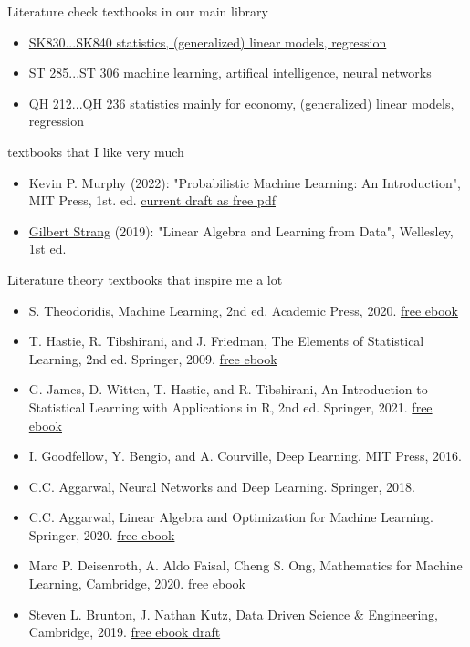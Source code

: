 \documentclass[mathserif, aspectratio=1610]{intbeamer}
\begin{document}
\begin{frame}{Literature}
  check textbooks in our main library
  \begin{itemize}
    \item \href{https://find.ub.uni-rostock.de/sk830}{SK830...SK840 statistics, (generalized) linear models, regression}
    \item ST 285...ST 306 machine learning, artifical intelligence, neural networks
    \item QH 212...QH 236 statistics mainly for economy, (generalized) linear models, regression
  \end{itemize}
  textbooks that I like very much
  \begin{itemize}
    \item Kevin P. Murphy (2022): "Probabilistic Machine Learning: An Introduction", MIT Press, 1st. ed.
    \href{https://probml.github.io/pml-book/book1.html}{current draft as free pdf}
    \item \href{https://math.mit.edu/~gs/}{Gilbert Strang} (2019): "Linear Algebra and Learning from Data", Wellesley, 1st ed.
  \end{itemize}
\end{frame}

\begin{frame}{Literature}
  theory textbooks that inspire me a lot
  \begin{itemize}
    \item S. Theodoridis, Machine Learning, 2nd ed. Academic Press, 2020.
    \href{https://www.sciencedirect.com/book/9780128188033/machine-learning}{free ebook}
    \item T. Hastie, R. Tibshirani, and J. Friedman, The Elements of Statistical Learning, 2nd ed. Springer, 2009.
    \href{https://hastie.su.domains/ElemStatLearn/}{free ebook}
    \item G. James, D. Witten, T. Hastie, and R. Tibshirani, An Introduction to Statistical Learning with Applications in R, 2nd ed. Springer, 2021. \href{https://www.statlearning.com/}{free ebook}
    \item I. Goodfellow, Y. Bengio, and A. Courville, Deep Learning. MIT Press, 2016.
    \item C.C. Aggarwal, Neural Networks and Deep Learning. Springer, 2018.
    \item C.C. Aggarwal, Linear Algebra and Optimization for Machine Learning. Springer, 2020. \href{https://link.springer.com/book/10.1007/978-3-030-40344-7}{free ebook}
    \item Marc P. Deisenroth, A. Aldo Faisal, Cheng S. Ong, Mathematics for Machine Learning, Cambridge, 2020. \href{https://mml-book.github.io/book/mml-book.pdf}{free ebook}
    \item Steven L. Brunton, J. Nathan Kutz, Data Driven Science \& Engineering, Cambridge, 2019. \href{http://www.databookuw.com/databook.pdf}{free ebook draft}
  \end{itemize}
\end{frame}
\end{document}

